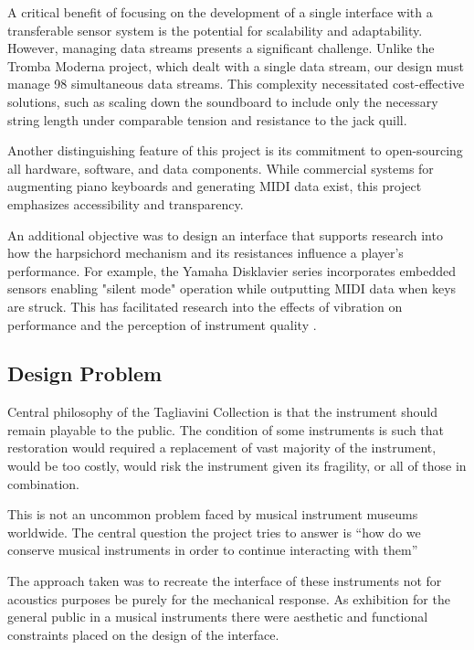 A critical benefit of focusing on the development of a single interface with a transferable sensor system is the potential for scalability and adaptability. However, managing data streams presents a significant challenge. Unlike the Tromba Moderna project, which dealt with a single data stream, our design must manage 98 simultaneous data streams. This complexity necessitated cost-effective solutions, such as scaling down the soundboard to include only the necessary string length under comparable tension and resistance to the jack quill.

Another distinguishing feature of this project is its commitment to open-sourcing all hardware, software, and data components. While commercial systems for augmenting piano keyboards and generating MIDI data exist, this project emphasizes accessibility and transparency.

An additional objective was to design an interface that supports research into how the harpsichord mechanism and its resistances influence a player’s performance. For example, the Yamaha Disklavier series incorporates embedded sensors enabling "silent mode" operation while outputting MIDI data when keys are struck. This has facilitated research into the effects of vibration on performance \cite{MusicalHaptics2018_04, MusicalHaptics2018_13} and the perception of instrument quality \cite{MusicalHaptics2018_05}.

\subsection{Design Problem}\label{design-problem}

Central philosophy of the Tagliavini Collection is that the instrument
should remain playable to the public. The condition of some instruments
is such that restoration would required a replacement of vast majority
of the instrument, would be too costly, would risk the instrument given
its fragility, or all of those in combination.

This is not an uncommon problem faced by musical instrument museums
worldwide. The central question the project tries to answer is ``how do
we conserve musical instruments in order to continue interacting with
them''

The approach taken was to recreate the interface of these instruments
not for acoustics purposes be purely for the mechanical response. As
exhibition for the general public in a musical instruments there were
aesthetic and functional constraints placed on the design of the
interface.

